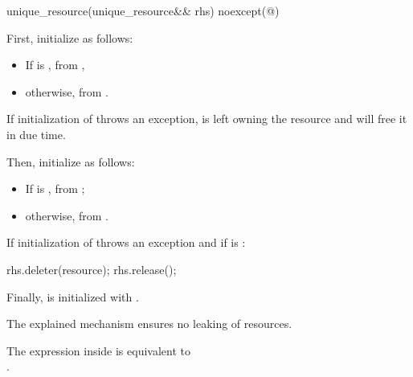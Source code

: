 \documentclass[ebook,11pt,article]{memoir}
\begin{document}
\begin{itemdecl}
unique_resource(unique_resource&& rhs) noexcept(@\seebelow@)
\end{itemdecl}

\begin{itemdescr}
\pnum
\effects First, initialize  as follows: 
\begin{itemize}
\item If  is , from , 
\item otherwise, from .  
\end{itemize}

\pnum
\begin{note}
If initialization of  throws an exception,  is left owning the resource and will free it in due time.
\end{note}

\pnum
Then, initialize  as follows: 
\begin{itemize}
\item If  is , 
from ;
\item otherwise, 
from . 
\end{itemize}

\pnum
If initialization of  throws an exception and 
if  is :
\begin{codeblock}
    rhs.deleter(resource); rhs.release();
\end{codeblock}

\pnum
Finally,  is initialized with .

\pnum
\begin{note}
The explained mechanism ensures no leaking of resources.
\end{note}

\pnum
\remarks
The expression inside  is equivalent to \\
 \tcode{\&\&} .
\end{itemdescr}

\end{document}
